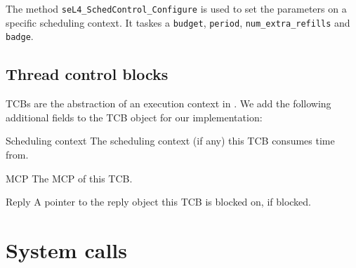 The method \texttt{seL4\_SchedControl\_Configure} is used to set the parameters on a specific scheduling context.
It taskes a \texttt{budget}, \texttt{period}, \texttt{num\_extra\_refills} and \texttt{badge}.


\subsection{Thread control blocks}

\glspl{TCB} are the abstraction of an execution context in \selfour. We add the following additional fields to the \gls{TCB} object for our implementation:

\begin{description}
    \item{Scheduling context} The scheduling context (if any) this \gls{TCB} consumes time from. 
    \item{\gls{MCP}} The \gls{MCP} of this \gls{TCB}.
    \item{Reply} A pointer to the reply object this TCB is blocked on, if blocked.
  
\end{description}


\section{System calls}

